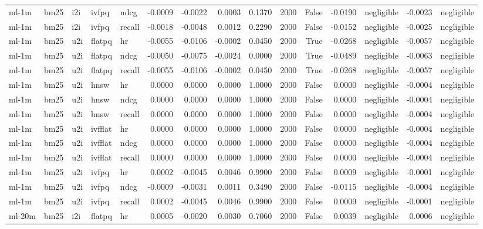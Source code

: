 \begin{tabular}{lllllrrrrrrrlrl}
ml-1m & bm25 & i2i & ivfpq & ndcg & -0.0009 & -0.0022 & 0.0003 & 0.1370 & 2000 & False & -0.0190 & negligible & -0.0023 & negligible \\
ml-1m & bm25 & i2i & ivfpq & recall & -0.0018 & -0.0048 & 0.0012 & 0.2290 & 2000 & False & -0.0152 & negligible & -0.0025 & negligible \\
ml-1m & bm25 & u2i & flatpq & hr & -0.0055 & -0.0106 & -0.0002 & 0.0450 & 2000 & True & -0.0268 & negligible & -0.0057 & negligible \\
ml-1m & bm25 & u2i & flatpq & ndcg & -0.0050 & -0.0075 & -0.0024 & 0.0000 & 2000 & True & -0.0489 & negligible & -0.0063 & negligible \\
ml-1m & bm25 & u2i & flatpq & recall & -0.0055 & -0.0106 & -0.0002 & 0.0450 & 2000 & True & -0.0268 & negligible & -0.0057 & negligible \\
ml-1m & bm25 & u2i & hnsw & hr & 0.0000 & 0.0000 & 0.0000 & 1.0000 & 2000 & False & 0.0000 & negligible & -0.0004 & negligible \\
ml-1m & bm25 & u2i & hnsw & ndcg & 0.0000 & 0.0000 & 0.0000 & 1.0000 & 2000 & False & 0.0000 & negligible & -0.0004 & negligible \\
ml-1m & bm25 & u2i & hnsw & recall & 0.0000 & 0.0000 & 0.0000 & 1.0000 & 2000 & False & 0.0000 & negligible & -0.0004 & negligible \\
ml-1m & bm25 & u2i & ivfflat & hr & 0.0000 & 0.0000 & 0.0000 & 1.0000 & 2000 & False & 0.0000 & negligible & -0.0004 & negligible \\
ml-1m & bm25 & u2i & ivfflat & ndcg & 0.0000 & 0.0000 & 0.0000 & 1.0000 & 2000 & False & 0.0000 & negligible & -0.0004 & negligible \\
ml-1m & bm25 & u2i & ivfflat & recall & 0.0000 & 0.0000 & 0.0000 & 1.0000 & 2000 & False & 0.0000 & negligible & -0.0004 & negligible \\
ml-1m & bm25 & u2i & ivfpq & hr & 0.0002 & -0.0045 & 0.0046 & 0.9900 & 2000 & False & 0.0009 & negligible & -0.0001 & negligible \\
ml-1m & bm25 & u2i & ivfpq & ndcg & -0.0009 & -0.0031 & 0.0011 & 0.3490 & 2000 & False & -0.0115 & negligible & -0.0004 & negligible \\
ml-1m & bm25 & u2i & ivfpq & recall & 0.0002 & -0.0045 & 0.0046 & 0.9900 & 2000 & False & 0.0009 & negligible & -0.0001 & negligible \\
ml-20m & bm25 & i2i & flatpq & hr & 0.0005 & -0.0020 & 0.0030 & 0.7060 & 2000 & False & 0.0039 & negligible & 0.0006 & negligible \\

\end{tabular}
